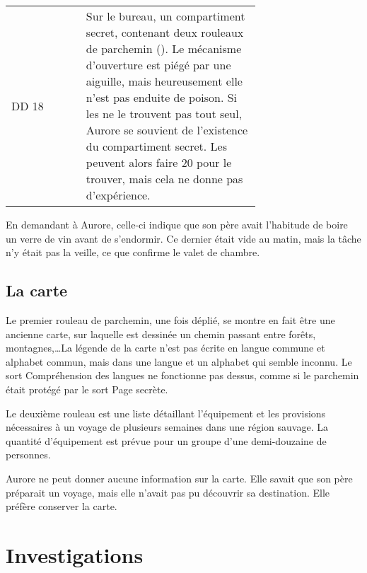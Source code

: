 \documentclass[a4paper,10pt,openany]{book}
\begin{document}
\begin{multicols}{2}
\begin{quotebox}
\begin{tabular}{lp{0.7\linewidth}}
		DD 18 & Sur le bureau, un compartiment secret, contenant deux rouleaux de parchemin (\XP{75}). Le mécanisme d’ouverture est piégé par une aiguille,
		mais heureusement elle n’est pas enduite de poison. Si les \PJs ne le trouvent pas tout seul, Aurore se souvient de l’existence du compartiment
		secret. Les \PJs peuvent alors faire 20 pour le trouver, mais cela ne donne pas d’expérience.
	\end{tabular}
\end{quotebox}
En demandant à Aurore, celle-ci indique que son père avait l’habitude de boire un verre de vin avant de s’endormir. Ce dernier était vide au matin,
mais la tâche n’y était pas la veille, ce que confirme le valet de chambre.
\subsection{La carte}
Le premier rouleau de parchemin, une fois déplié, se montre en fait être une ancienne carte, sur laquelle est dessinée un chemin passant entre forêts,
montagnes,\ldots La légende de la carte n’est pas écrite en langue commune et alphabet commun, mais dans une langue et un alphabet qui semble inconnu.
Le sort Compréhension des langues ne fonctionne pas dessus, comme si le parchemin était protégé par le sort Page secrète.\par Le deuxième rouleau est
une liste détaillant l’équipement et les provisions nécessaires à un voyage de plusieurs semaines dans une région sauvage. La quantité d’équipement
est prévue pour un groupe d’une demi-douzaine de personnes.\par Aurore ne peut donner aucune information sur la carte. Elle savait que son père
préparait un voyage, mais elle n’avait pas pu découvrir sa destination. Elle préfère conserver la carte.
\section{Investigations}

\end{multicols}
\end{document}
